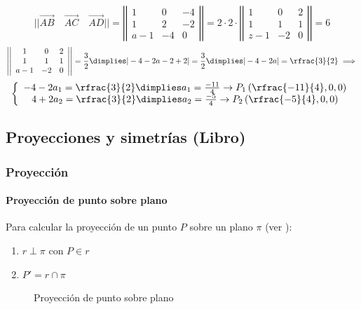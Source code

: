 \begin{problem}[Junio 2019]
\[
||\vec{AB}\quad\vec{AC}\quad\vec{AD}|| = 
\left|\left|\begin{array}{ccc}
1 & 0 & -4\\
1 & 2 & -2\\
a-1 & -4& 0
\end{array}\right|\right| = 2·2·\left|\left|\begin{array}{ccc}
1 & 0 & 2\\
1 & 1 & 1\\
z-1 & -2& 0
\end{array}\right|\right| = {6} 
\]
\[
 \left|\left|\begin{array}{ccc}
1 & 0 & 2\\
1 & 1 & 1\\
a-1 & -2& 0
\end{array}\right|\right| = \frac{3}{2}  \dimplies
|-4 -2a-2+2| = \frac{3}{2}\dimplies |-4-2a| = \rfrac{3}{2} \implies\]
\[
\left\{\begin{array}{c}
-4-2a_1 = \rfrac{3}{2} \dimplies a_1 = \frac{-11}{4} \to P_1\left(\rfrac{-11}{4},0,0\right)\\
4+2a_2 = \rfrac{3}{2} \dimplies a_2 = \frac{-5}{4} \to P_2\left(\rfrac{-5}{4},0,0\right)
\end{array}\right.
\]

\end{problem}


\subsection{Proyecciones y simetrías (Libro)}

\subsubsection{Proyección}

\paragraph{Proyección de punto sobre plano}

Para calcular la proyección de un punto $P$ sobre un plano $\pi$ (ver ):
\begin{enumerate}
  \item $r\perp \pi$ con $P\in r$
  \item $P' = r\cap \pi$
\end{enumerate}

\begin{figure}[hbtp]
\centering
{}

\label{fig::proy::punto-plano}
\caption{Proyección de punto sobre plano}
\end{figure}


